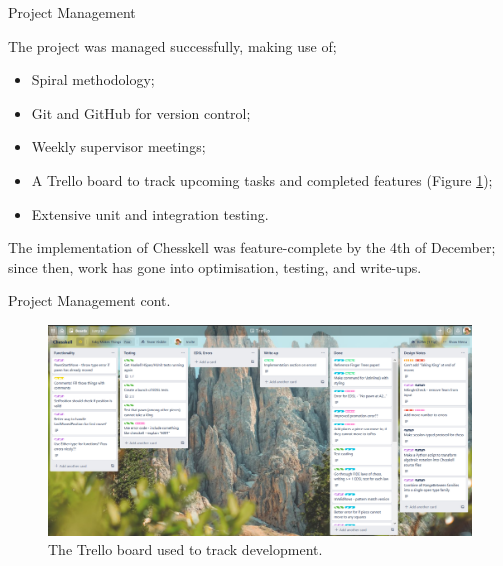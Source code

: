 \documentclass{beamer}
\begin{document}
\begin{frame}{Project Management}

The project was managed successfully, making use of;

\begin{itemize}
    \item<2-> Spiral methodology;
    \item<3-> Git and GitHub for version control;
    \item<4-> Weekly supervisor meetings;
    \item<5-> A Trello board to track upcoming tasks and completed features (Figure \ref{trello}); 
    \item<6-> Extensive unit and integration testing.
\end{itemize}

\begin{overprint}

The implementation of Chesskell was feature-complete by the 4th of December; since then, work has gone into optimisation, testing, and write-ups.
    
\end{overprint}



\end{frame}

\begin{frame}{Project Management cont.}
\begin{figure}
    \includegraphics[width=\linewidth]{trello.png}
    \caption{The Trello board used to track development.}
    \label{trello}
\end{figure}
\end{frame}
\end{document}
